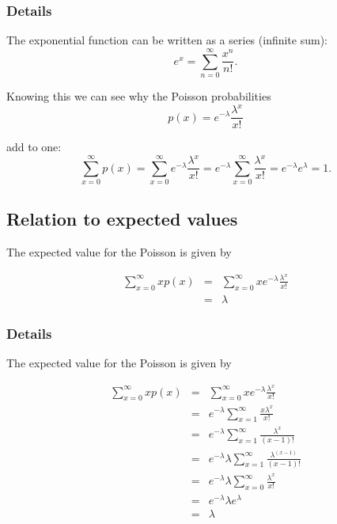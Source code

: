 \documentclass[12pt,a4paper]{article}
\theoremstyle{regla}
\theoremstyle{remark}
\theoremstyle{definition}
\theoremstyle{nonumberbreak}
\begin{document}
\subsubsection{Details}
The exponential function can be written as a series (infinite sum):
$$e^x=\sum_{n=0}^{\infty}\frac{x^n}{n!}.$$

 

Knowing this we can see why the Poisson probabilities 
$$p(x)=e^{-\lambda}\frac{\lambda^x}{x!}$$

 
add to one: 
$$\sum_{x=0}^{\infty}p(x)=\sum_{x=0}^{\infty}e^{-\lambda}\frac{\lambda^x}{x!}=e^{-\lambda}\sum_{x=0}^{\infty}\frac{\lambda^x}{x!}=e^{-\lambda}e^{\lambda}=1.$$



\subsection{Relation to expected values}
\begin{fbox}
\begin{minipage}{0.97\textwidth}
The expected value for the Poisson is given by 

\begin{eqnarray*}
\sum_{x=0}^\infty x p(x) &=& \sum_{x=0}^\infty x e^{-\lambda} \frac{\lambda^x}{x!} \\
                         &=& \lambda
\end{eqnarray*}

\end{minipage}
\end{fbox}
\subsubsection{Details}
The expected value for the Poisson is given by 

\begin{eqnarray*}
\sum_{x=0}^\infty x p(x) &=& \sum_{x=0}^\infty x e^{-\lambda} \frac{\lambda^x}{x!} \\
                         &=& e^{-\lambda} \sum_{x=1}^\infty   \frac{x\lambda^x}{x!} \\
                         &=& e^{-\lambda} \sum_{x=1}^\infty   \frac{\lambda^x}{(x-1)!} \\
                         &=& e^{-\lambda} \lambda \sum_{x=1}^\infty   \frac{\lambda^{(x-1)}}{(x-1)!} \\
                         &=& e^{-\lambda} \lambda \sum_{x=0}^\infty   \frac{\lambda^{x}}{x!} \\
                         &=& e^{-\lambda} \lambda  e^{\lambda}\\
                         &=& \lambda
\end{eqnarray*}
\end{document}
